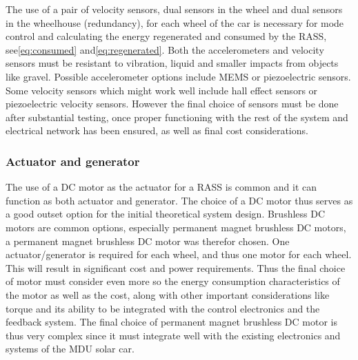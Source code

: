 The use of a pair of velocity sensors, dual sensors in the wheel and dual sensors in the wheelhouse (redundancy), for each wheel of the car is necessary for mode control and calculating the energy regenerated and consumed by the RASS, see\:\eqref{eq:consumed} and\:\eqref{eq:regenerated}.
Both the accelerometers and velocity sensors must be resistant to vibration, liquid and smaller impacts from objects like gravel. Possible accelerometer options include MEMS or piezoelectric sensors. Some velocity sensors which might work well include hall effect sensors or piezoelectric velocity sensors.
However the final choice of sensors must be done after substantial testing, once proper functioning with the rest of the system and electrical network has been ensured, as well as final cost considerations.

\subsubsection{Actuator and generator}
The use of a DC motor as the actuator for a RASS is common and it can function as both actuator and generator\:\cite{liuTransmissionEnergyharvestingStudy2021}\cite{liuModelingSimulationEnergyRegenerative2019}\cite{zhengNovelEnergyregenerativeActive2008}. The choice of a DC motor thus serves as a good outset option for the initial theoretical system design. 
Brushless DC motors are common options\:\cite{zhengNovelEnergyregenerativeActive2008}, especially permanent magnet brushless DC motors\:\cite{liuTransmissionEnergyharvestingStudy2021}\cite{liuModelingSimulationEnergyRegenerative2019}\cite{yongchaozhangExperimentalVerificationEnergyregenerative2007}, a permanent magnet brushless DC motor was therefor chosen. 
One actuator/generator is required for each wheel, and thus one motor for each wheel. This will result in significant cost and power requirements. Thus the final choice of motor must consider even more so the energy consumption characteristics of the motor as well as the cost, along with other important considerations like torque and its ability to be integrated with the control electronics and the feedback system.
The final choice of permanent magnet brushless DC motor is thus very complex since it must integrate well with the existing electronics and systems of the MDU solar car.

